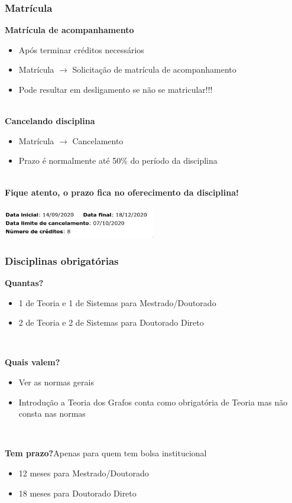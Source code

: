 \documentclass{beamer}
\begin{document}
\begin{frame}
  \frametitle{Matrícula}

  \textbf{Matrícula de acompanhamento}
  \begin{itemize}
    \item Após terminar créditos necessários
    \item Matrícula $\to$ Solicitação de matrícula de acompanhamento
    \item Pode resultar em desligamento se não se matricular!!!
  \end{itemize}~\\

  \textbf{Cancelando disciplina}
  \begin{itemize}
    \item Matrícula $\to$ Cancelamento
    \item Prazo é normalmente até 50\% do período da disciplina
  \end{itemize}~\\

  \textbf{Fique atento, o prazo fica no oferecimento da disciplina!}\\~\\
  \centering\includegraphics[width=0.5\textwidth]{imgs/cancelamento.png}
\end{frame}

\begin{frame}
  \frametitle{Disciplinas obrigatórias}

  \textbf{Quantas?}
  \begin{itemize}
    \item 1 de Teoria e 1 de Sistemas para Mestrado/Doutorado
    \item 2 de Teoria e 2 de Sistemas para Doutorado Direto
  \end{itemize}~\\\pause

  \textbf{Quais valem?}
  \begin{itemize}
    \item Ver as normas gerais
    \item Introdução a Teoria dos Grafos conta como obrigatória de Teoria mas não consta nas normas
  \end{itemize}~\\\pause

  \textbf{Tem prazo?}\pause Apenas para quem tem bolsa institucional
  \begin{itemize}
    \item 12 meses para Mestrado/Doutorado
    \item 18 meses para Doutorado Direto
  \end{itemize}
\end{frame}
\end{document}
